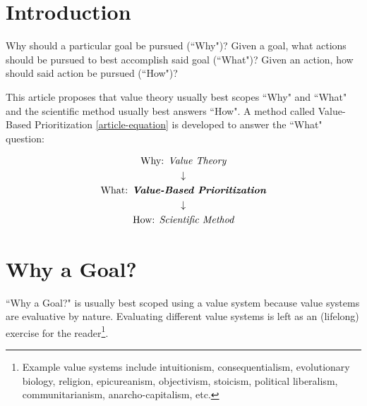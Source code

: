 \documentclass[12pt, a4paper, twocolumn]{article}
\begin{document}

\twocolumn[
  \begin{@twocolumnfalse}
    \maketitle
    \begin{abstract}
      \abstractText
      \newline
      \newline
    \end{abstract}
  \end{@twocolumnfalse}
]


\section{Introduction}

Why should a particular goal be pursued (``Why")? Given a goal, what actions should be pursued to best accomplish said goal (``What")? Given an action, how should said action be pursued (``How")?

This article proposes that value theory usually best scopes ``Why" and ``What" and the scientific method usually best answers ``How". A method called Value-Based Prioritization \eqref{article-equation} is developed to answer the ``What" question:

\begin{equation}\label{article-equation}
  \begin{gathered}
    \textrm{Why: } \textit{Value Theory} \\
    \downarrow \\
    \textrm{What: } \textit{\textbf{Value-Based Prioritization}} \\
    \downarrow \\
    \textrm{How: } \textit{Scientific Method}
  \end{gathered}
\end{equation}

\section{Why a Goal?}

``Why a Goal?" is usually best scoped using a value system because value systems are evaluative by nature\cite{value-theory}. Evaluating different value systems is left as an (lifelong) exercise for the reader\footnote{Example value systems include intuitionism\cite{huemer2007ethical}, consequentialism\cite{consequentialism}, evolutionary biology\cite{morality-biology}, religion\cite{religion-morality}, epicureanism\cite{epicurus}, objectivism\cite{ayn-rand}, stoicism\cite{stoicism}, political liberalism\cite{rawls}, communitarianism\cite{communitarianism}, anarcho-capitalism\cite{huemer2013problem}, etc.}.
\end{document}
